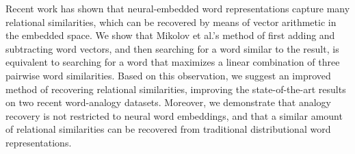 Recent work has shown that neural-embedded word representations capture many relational similarities, which can be recovered by means of vector arithmetic in the embedded space. We show that Mikolov et al.'s method of first adding and subtracting word vectors, and then searching for a word similar to the result, is equivalent to searching for a word that maximizes a linear combination of three pairwise word similarities. Based on this observation, we suggest an improved method of recovering relational similarities, improving the state-of-the-art results on two recent word-analogy datasets. Moreover, we demonstrate that analogy recovery is not restricted to neural word embeddings, and that a similar amount of relational similarities can be recovered from traditional distributional word representations.
